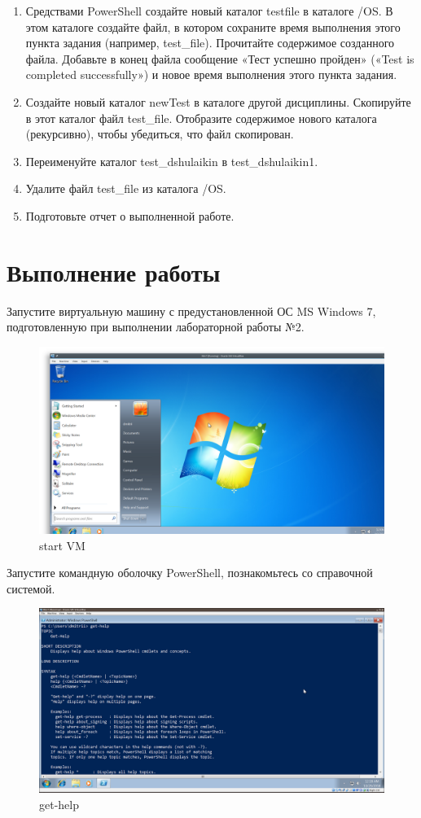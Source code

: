 \documentclass[a4paper]{article}
\begin{document}
\begin{enumerate}
    \item  Средствами PowerShell создайте новый каталог testfile в каталоге /OS. В этом каталоге создайте файл, в котором сохраните время выполнения этого пункта задания (например, test\_file). Прочитайте содержимое созданного файла. Добавьте в конец файла сообщение «Тест успешно пройден» («Test is completed successfully») и новое время выполнения этого пункта задания.
    \item  Создайте новый каталог newTest в каталоге другой дисциплины. Скопируйте в этот каталог файл test\_file. Отобразите содержимое нового каталога (рекурсивно), чтобы убедиться, что файл скопирован.
    \item  Переименуйте каталог test\_dshulaikin в test\_dshulaikin1.
    \item  Удалите файл test\_file из каталога /OS.
    \item  Подготовьте отчет о выполненной работе.
\end{enumerate}
\section{Выполнение работы}

Запустите виртуальную машину с предустановленной ОС MS Windows 7, подготовленную при выполнении лабораторной работы №2.
\begin{figure}[H]
    \centering
    \includegraphics[width=\linewidth]{1.png}
    \caption{start VM}
\end{figure}

Запустите командную оболочку PowerShell, познакомьтесь со справочной системой.
\begin{figure}[H]
    \centering
    \includegraphics[width=\linewidth]{2.png}
    \caption{get-help}
\end{figure}
\end{document}
